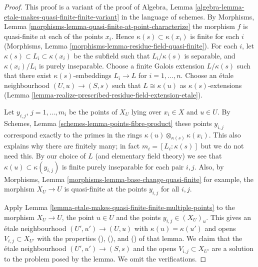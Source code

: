 \documentclass[10pt,a4paper]{amsart}
\theoremstyle{plain}
\theoremstyle{definition}
\theoremstyle{remark}
\numberwithin{equation}{subsection}
\begin{document}
\begin{proof}
This proof is a variant of the proof of
Algebra, Lemma \ref{algebra-lemma-etale-makes-quasi-finite-finite-variant}
in the language of schemes.
By Morphisms, Lemma \ref{morphisms-lemma-quasi-finite-at-point-characterize}
the morphism $f$ is quasi-finite at each of the points $x_i$.
Hence $\kappa(s) \subset \kappa(x_i)$ is finite for each $i$
(Morphisms, Lemma \ref{morphisms-lemma-residue-field-quasi-finite}).
For each $i$, let $\kappa(s) \subset L_i \subset \kappa(x_i)$
be the subfield such that $L_i/\kappa(s)$ is separable, and
$\kappa(x_i)/L_i$ is purely inseparable. Choose a finite Galois
extension $L/\kappa(s)$ such that there exist
$\kappa(s)$-embeddings $L_i \to L$ for $i = 1, \ldots, n$.
Choose an \'etale neighbourhood $(U, u) \to (S, s)$ such that
$L \cong \kappa(u)$ as $\kappa(s)$-extensions
(Lemma \ref{lemma-realize-prescribed-residue-field-extension-etale}).

\medskip\noindent
Let $y_{i, j}$, $j = 1, \ldots, m_i$ be the points of $X_U$
lying over $x_i \in X$ and $u \in U$. By
Schemes, Lemma \ref{schemes-lemma-points-fibre-product}
these points $y_{i, j}$ correspond exactly to the primes in the rings
$\kappa(u) \otimes_{\kappa(s)} \kappa(x_i)$. This also
explains why there are finitely many; in fact
$m_i = [L_i : \kappa(s)]$ but we do not need this.
By our choice of
$L$ (and elementary field theory)
we see that $\kappa(u) \subset \kappa(y_{i, j})$ is
finite purely inseparable for each pair $i, j$.
Also, by Morphisms, Lemma \ref{morphisms-lemma-base-change-quasi-finite}
for example, the morphism
$X_U \to U$ is quasi-finite at the points $y_{i, j}$ for
all $i, j$.

\medskip\noindent
Apply Lemma \ref{lemma-etale-makes-quasi-finite-finite-multiple-points}
to the morphism $X_U \to U$, the point $u \in U$
and the points $y_{i, j} \in (X_U)_u$. This gives an \'etale neighbourhood
$(U', u') \to (U, u)$ with $\kappa(u) = \kappa(u')$ and
opens $V_{i, j} \subset X_{U'}$ with the properties
(), (), and ()
of that lemma. We claim that the \'etale neighbourhood
$(U', u') \to (S, s)$ and the opens $V_{i, j} \subset X_{U'}$
are a solution to the problem posed by the lemma.
We omit the verifications.
\end{proof}
\end{document}
